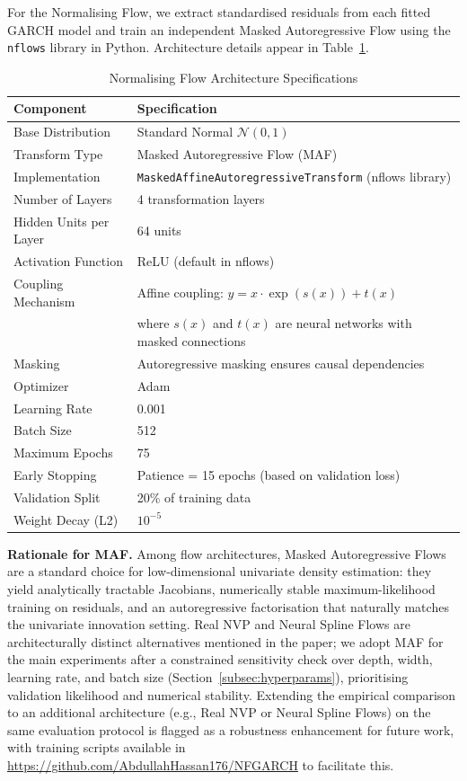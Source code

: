 \documentclass[risks,article,submit,pdftex,moreauthors]{Definitions/mdpi}
\newcommand{\supprepo}{\href{https://github.com/AbdullahHassan176/NFGARCH}{https://github.com/AbdullahHassan176/NFGARCH}}
\begin{document}
For the Normalising Flow, we extract standardised residuals from each fitted GARCH model and train an independent Masked Autoregressive Flow using the \texttt{nflows} library in \textsf{Python}. Architecture details appear in Table~\ref{tab:flow_architecture}.

\begin{table}[H]
\centering
\caption{Normalising Flow Architecture Specifications}
\label{tab:flow_architecture}
\small
\setlength{\tabcolsep}{6pt}
\begin{tabularx}{\linewidth}{ll}
\toprule
\textbf{Component} & \textbf{Specification} \\
\midrule
Base Distribution & Standard Normal $\mathcal{N}(0,1)$ \\
Transform Type & Masked Autoregressive Flow (MAF) \\
Implementation & \texttt{MaskedAffineAutoregressiveTransform} (nflows library) \\
Number of Layers & 4 transformation layers \\
Hidden Units per Layer & 64 units \\
Activation Function & ReLU (default in nflows) \\
Coupling Mechanism & Affine coupling: $y = x \cdot \exp(s(x)) + t(x)$ \\
& where $s(x)$ and $t(x)$ are neural networks with masked connections \\
Masking & Autoregressive masking ensures causal dependencies \\
Optimizer & Adam \\
Learning Rate & 0.001 \\
Batch Size & 512 \\
Maximum Epochs & 75 \\
Early Stopping & Patience = 15 epochs (based on validation loss) \\
Validation Split & 20\% of training data \\
Weight Decay (L2) & $10^{-5}$ \\
\bottomrule
\end{tabularx}
\end{table}

\noindent\textbf{Rationale for MAF.} Among flow architectures, Masked Autoregressive Flows \citep{papamakarios2017masked} are a standard choice for low-dimensional univariate density estimation: they yield analytically tractable Jacobians, numerically stable maximum-likelihood training on residuals, and an autoregressive factorisation that naturally matches the univariate innovation setting. Real NVP \citep{dinh2016density} and Neural Spline Flows \citep{durkan2019neural} are architecturally distinct alternatives mentioned in the paper; we adopt MAF for the main experiments after a constrained sensitivity check over depth, width, learning rate, and batch size (Section~\ref{subsec:hyperparams}), prioritising validation likelihood and numerical stability. Extending the empirical comparison to an additional architecture (e.g., Real NVP or Neural Spline Flows) on the same evaluation protocol is flagged as a robustness enhancement for future work, with training scripts available in \supprepo{} to facilitate this.
\end{document}
